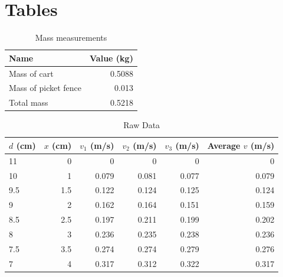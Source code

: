 \section{Tables}
%
\begin{table}[ht]
    \centering
    \begin{tabular}{|l|r|}
        \hline
        Name & Value (kg) \\
        \hline
        Mass of cart & 0.5088 \\
        Mass of picket fence & 0.013 \\
        \hline
        Total mass & 0.5218 \\
        \hline
    \end{tabular}
    \caption{Mass measurements}
    \label{table:06.mass}
\end{table}
%
\begin{table}[ht]
    \centering
    \begin{tabular}{|l|r|r|r|r|r|}
        \hline
        $d$ (cm) & $x$ (cm) & $v_{1}$ (m/s) & $v_{2}$ (m/s) & $v_{3}$ (m/s) & Average $v$ (m/s) \\
        \hline
        11 & 0 & 0 & 0 & 0 & 0 \\
        10 & 1 & 0.079 & 0.081 & 0.077 & 0.079 \\
        9.5 & 1.5 & 0.122 & 0.124 & 0.125 & 0.124 \\
        9 & 2 & 0.162 & 0.164 & 0.151 & 0.159 \\
        8.5 & 2.5 & 0.197 & 0.211 & 0.199 & 0.202 \\
        8 & 3 & 0.236 & 0.235 & 0.238 & 0.236 \\
        7.5 & 3.5 & 0.274 & 0.274 & 0.279 & 0.276 \\
        7 & 4 & 0.317 & 0.312 & 0.322 & 0.317 \\
        \hline
    \end{tabular}
    \caption{Raw Data}
    \label{table:06.data}
\end{table}
%
\newpage
